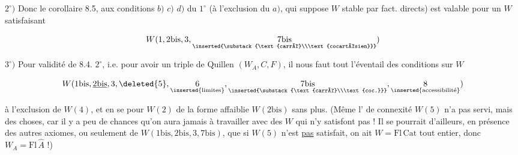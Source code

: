 
$2^\circ)$ Donc le corollaire 8.5,   aux conditions $b)$ $c)$ $d)$ du $1^\circ$ (à l'exclusion du $a)$, qui suppose $W$ stable par fact. directs) est valable pour un $W$ satisfaisant

\[
W(1,2\mathrm{bis},3,\underset{\inserted{\substack{\text{carré}\\\text{cocartésien}}}}{7\mathrm{bis}})
\]

$3^\circ)$ Pour  validité de 8.4. $2^\circ$, i.e. pour avoir un triple de Quillen $(W_A,C,F)$, il nous faut  tout l'éventail des conditions sur $W$

\[
W(1\mathrm{bis},\underline{2\mathrm{bis}},3,\deleted{5},\underset{\inserted{\text{limites}}}{6},
\underset{\inserted{\substack{\text{carré}\\\text{coc.}}}}{7\mathrm{bis}},
\underset{\inserted{\text{accessibilité}}}{8})
\]


à l'exclusion de $W(4)$, et en se  pour $W(2)$ de la forme affaiblie $W(2\mathrm{bis})$ sans plus. (Même l' de connexité $W(5)$ n'a pas servi, mais   des choses,  car il y a peu de chances qu'on aura jamais à travailler avec des $W$ qui n'y satisfont pas ! \deleted{\unsure{)}} Il se pourrait d'ailleurs, en présence des autres axiomes, ou seulement de $W(1\mathrm{bis},2\mathrm{bis},3,7\mathrm{bis})$, que si $W(5)$ n'est \uline{pas} satisfait, on ait $W=\mathrm{Fl}\,\mathrm{Cat}$ tout entier, donc $W_A=\mathrm{Fl}\,\widehat A$ !)
